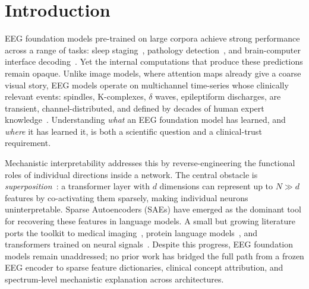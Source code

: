 \documentclass{article}
\begin{document}
\section{Introduction}
\label{sec:intro}

EEG foundation models pre-trained on large corpora achieve strong performance across a range of tasks: sleep staging~\cite{thapa2024sleepfm}, pathology detection~\cite{elouahidi2025reve}, and brain-computer interface decoding~\cite{jiang2024labram, kostas2021bendr}. Yet the internal computations that produce these predictions remain opaque. Unlike image models, where attention maps already give a coarse visual story, EEG models operate on multichannel time-series whose clinically relevant events: spindles, K-complexes, $\delta$ waves, epileptiform discharges, are transient, channel-distributed, and defined by decades of human expert knowledge~\cite{beniczky2017score}. Understanding \emph{what} an EEG foundation model has learned, and \emph{where} it has learned it, is both a scientific question and a clinical-trust requirement.

Mechanistic interpretability \cite{elhage2021mathematical,elhage2022superposition} addresses this by reverse-engineering the functional roles of individual directions inside a network. The central obstacle is \textit{superposition}~\cite{elhage2022superposition}: a transformer layer with $d$ dimensions can represent up to $N \gg d$ features by co-activating them sparsely, making individual neurons uninterpretable. Sparse Autoencoders (SAEs) \cite{bricken2023monosemanticity, templeton2024scaling, lieberum2024gemma} have emerged as the dominant tool for recovering these features in language models. A small but growing literature ports the toolkit to medical
imaging~\cite{renzulli2025medsae, nakka2025mammosae}, protein
language models~\cite{simon2025interplm}, and transformers
trained on neural signals~\cite{freeman2025beyond,
kalnare2025mechanistic}. Despite this progress, EEG foundation models remain
unaddressed; no prior work has bridged the full path from a
frozen EEG encoder to sparse feature dictionaries, clinical
concept attribution, and spectrum-level mechanistic explanation
across architectures.

\vspace{3em}
\end{document}

